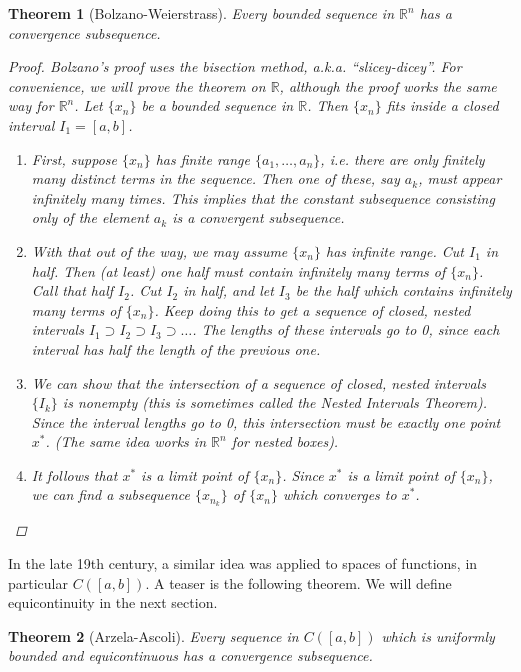 \documentclass[12pt]{amsart}         %
\newtheorem{theorem}{Theorem}[section]
\theoremstyle{remark}
\newcommand{\R}{\mathbb{R}}
\begin{document}
\begin{theorem}[Bolzano-Weierstrass]Every bounded sequence in $\R^n$ has a convergence subsequence.
\begin{proof}
Bolzano's proof uses the bisection method, a.k.a. ``slicey-dicey''. For convenience, we will prove the theorem on $\R$, although the proof works the same way for $\R^n$. Let $\{ x_n \}$ be a bounded sequence in $\R$. Then $\{ x_n \}$ fits inside a closed interval $I_1 = [a,b]$.
\begin{enumerate}
    \item First, suppose $\{ x_n \}$ has finite range $\{a_1, \dots, a_n \}$, i.e. there are only finitely many distinct terms in the sequence. Then one of these, say $a_k$, must appear infinitely many times. This implies that the constant subsequence consisting only of the element $a_k$ is a convergent subsequence.
    \item With that out of the way, we may assume $\{ x_n \}$ has infinite range. Cut $I_1$ in half. Then (at least) one half must contain infinitely many terms of $\{ x_n \}$. Call that half $I_2$. Cut $I_2$ in half, and let $I_3$ be the half which contains infinitely many terms of $\{ x_n \}$. Keep doing this to get a sequence of closed, nested intervals $I_1 \supset I_2 \supset I_3 \supset \dots$. The lengths of these intervals go to 0, since each interval has half the length of the previous one.
    \item We can show that the intersection of a sequence of closed, nested intervals $\{I_k\}$ is nonempty (this is sometimes called the Nested Intervals Theorem). Since the interval lengths go to 0, this intersection must be exactly one point $x^*$. (The same idea works in $\R^n$ for nested boxes).
    \item It follows that $x^*$ is a limit point of $\{ x_n \}$. Since $x^*$ is a limit point of $\{ x_n \}$, we can find a subsequence $\{x_{n_k}\}$ of $\{ x_n \}$ which converges to $x^*$.
\end{enumerate}
\end{proof}
\end{theorem}

In the late 19th century, a similar idea was applied to spaces of functions, in particular $C([a,b])$. A teaser is the following theorem. We will define equicontinuity in the next section.

\begin{theorem}[Arzela-Ascoli]Every sequence in $C([a,b])$ which is uniformly bounded and equicontinuous has a convergence subsequence.
\end{theorem}
\end{document}
